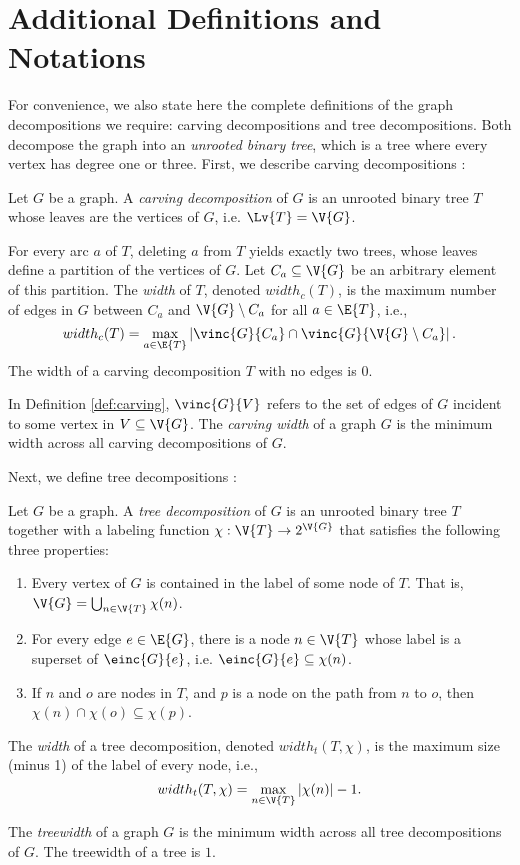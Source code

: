 \section{Additional Definitions and Notations}
For convenience, we also state here the complete definitions of the graph  decompositions we require: carving decompositions and tree decompositions. Both decompose the graph into an \emph{unrooted binary tree}, which is a tree where
every vertex has degree one or three.  First, we describe carving decompositions \cite{ST94}:
\begin{definition}
\label{def:carving}
	Let $G$ be a graph. A \emph{carving decomposition} of $G$ is an unrooted binary tree $T$ whose leaves are the vertices of $G$, i.e. $\Lv{T} = \V{G}$. 
	
    For every arc $a$ of $T$, deleting $a$ from $T$ yields exactly two trees, whose leaves define a partition of the vertices of $G$. Let $C_a \subseteq \V{G}$ be an arbitrary element of this partition. The \emph{width} of $T$, denoted $width_c(T)$, is the maximum number of edges in $G$ between $C_a$ and $\V{G} \setminus C_a$ for all $a \in \E{T}$, i.e.,
	$$width_c(T) = \max_{a \in \E{T}} \left| \vinc{G}{C_a} \cap \vinc{G}{\V{G} \setminus C_a} \right|.$$
    The width of a carving decomposition $T$ with no edges is 0.
\end{definition}

In Definition \ref{def:carving}, $\vinc{G}{V}$ refers to the set of edges of $G$ incident to some vertex in $V \subseteq \V{G}$. The \emph{carving width} of a graph $G$ is the minimum width across all carving decompositions of $G$.

Next, we define tree decompositions \cite{RS91}:
\begin{definition}
	Let $G$ be a graph. A \emph{tree decomposition} of $G$ is an unrooted binary tree $T$ together with a labeling function $\chi : \V{T} \rightarrow 2^{\V{G}}$ that satisfies the following three properties:
	\begin{enumerate}
		\item Every vertex of $G$ is contained in the label of some node of $T$. That is, $\V{G} = \bigcup_{n \in \V{T}} \chi(n)$.
		\item For every edge $e \in \E{G}$, there is a node $n \in \V{T}$ whose label is a superset of $\einc{G}{e}$, i.e. $\einc{G}{e} \subseteq \chi(n)$.
		\item If $n$ and $o$ are nodes in $T$, and $p$ is a node on the path from $n$ to $o$, then $\chi(n) \cap \chi(o) \subseteq \chi(p)$.
	\end{enumerate}
	The \emph{width} of a tree decomposition, denoted $width_t(T, \chi)$, is the maximum size (minus 1) of the label of every node, i.e.,
	$$width_t(T, \chi) = \max_{n \in \V{T}} | \chi(n) | - 1.$$
\end{definition}
The \emph{treewidth} of a graph $G$ is the minimum width across all tree decompositions of $G$. The treewidth of a tree is $1$.